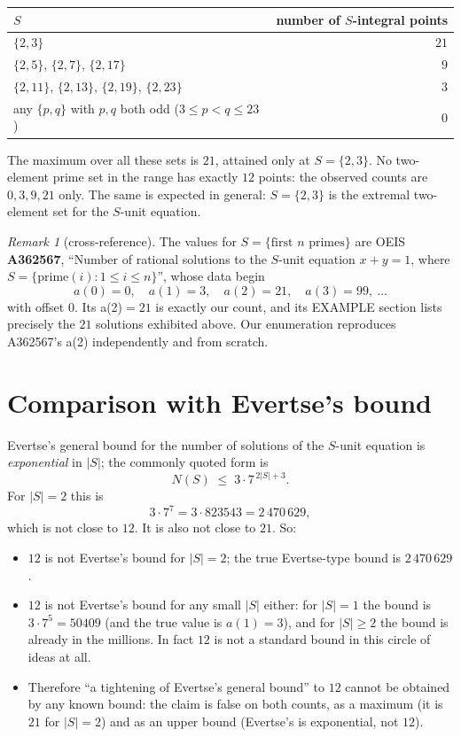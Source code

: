 \documentclass[11pt]{article}
\theoremstyle{definition}
\theoremstyle{remark}
\newtheorem{remark}[theorem]{Remark}
\begin{document}
\begin{center}
\begin{tabular}{l r}
\toprule
$S$ & number of $S$-integral points \\
\midrule
$\{2,3\}$  & $21$ \\
$\{2,5\}$, $\{2,7\}$, $\{2,17\}$ & $9$ \\
$\{2,11\}$, $\{2,13\}$, $\{2,19\}$, $\{2,23\}$ & $3$ \\
any $\{p,q\}$ with $p,q$ both odd ($3\le p<q\le 23$) & $0$ \\
\bottomrule
\end{tabular}
\end{center}

The maximum over all these sets is $21$, attained only at $S=\{2,3\}$. No
two-element prime set in the range has exactly $12$ points: the observed counts
are $0,3,9,21$ only. The same is expected in general: $S=\{2,3\}$ is the
extremal two-element set for the $S$-unit equation.

\begin{remark}[cross-reference]
The values for $S=\{\text{first }n\text{ primes}\}$ are OEIS
\textbf{A362567}, ``Number of rational solutions to the $S$-unit equation
$x+y=1$, where $S=\{\text{prime}(i):1\le i\le n\}$'', whose data begin
\[
a(0)=0,\quad a(1)=3,\quad a(2)=21,\quad a(3)=99,\ \dots
\]
with offset $0$. Its a(2)${}=21$ is exactly our count, and its EXAMPLE section
lists precisely the $21$ solutions exhibited above. Our enumeration reproduces
A362567's a(2) independently and from scratch.
\end{remark}

\section{Comparison with Evertse's bound}

Evertse's general bound for the number of solutions of the $S$-unit equation is
\emph{exponential} in $|S|$; the commonly quoted form is
\[
N(S) \;\le\; 3\cdot 7^{\,2|S|+3}.
\]
For $|S|=2$ this is
\[
3\cdot 7^{7} = 3\cdot 823543 = 2\,470\,629,
\]
which is not close to $12$. It is also not close to $21$. So:

\begin{itemize}
\item $12$ is not Evertse's bound for $|S|=2$; the true Evertse-type bound is
  $2\,470\,629$.
\item $12$ is not Evertse's bound for any small $|S|$ either: for $|S|=1$ the
  bound is $3\cdot 7^{5}=50409$ (and the true value is $a(1)=3$), and for
  $|S|\ge 2$ the bound is already in the millions. In fact $12$ is not a
  standard bound in this circle of ideas at all.
\item Therefore ``a tightening of Evertse's general bound'' to $12$ cannot be
  obtained by any known bound: the claim is false on both counts, as a maximum
  (it is $21$ for $|S|=2$) and as an upper bound (Evertse's is exponential,
  not $12$).
\end{itemize}
\end{document}
